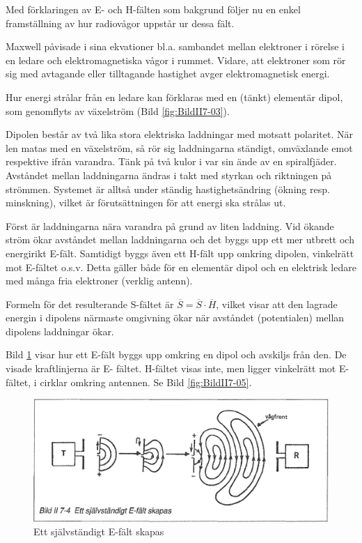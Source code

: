 Med förklaringen av E- och H-fälten som bakgrund följer nu en enkel
framställning av hur radiovågor uppstår ur dessa fält.

Maxwell påvisade i sina ekvationer bl.a.  sambandet mellan elektroner
i rörelse i en ledare och elektromagnetiska vågor i rummet.  Vidare,
att elektroner som rör sig med avtagande eller tilltagande hastighet
avger elektromagnetisk energi.

Hur energi strålar från en ledare kan förklaras med en (tänkt)
elementär dipol, som genomflyts av växelström (Bild \ref{fig:BildII7-03}).

Dipolen består av två lika stora elektriska laddningar med motsatt
polaritet. När len matas med en växelström, så rör sig laddningarna
ständigt, omväxlande emot respektive ifrån varandra. Tänk på två kulor
i var sin ände av en spiralfjäder. Avståndet mellan laddningarna
ändras i takt med styrkan och riktningen på strömmen. Systemet är
alltså under ständig hastighetsändring (ökning resp. minskning),
vilket är förutsättningen för att energi ska strålas ut.

Först är laddningarna nära varandra på grund av liten laddning. Vid
ökande ström ökar avståndet mellan laddningarna och det byggs upp ett
mer utbrett och energirikt E-fält. Samtidigt byggs även ett H-fält upp
omkring dipolen, vinkelrätt mot E-fältet o.s.v.  Detta gäller både för
en elementär dipol och en elektrisk ledare med många fria elektroner
(verklig antenn).

Formeln för det resulterande S-fältet är \(\overline{S} =
\overline{S}\cdot\overline{H}\), vilket visar att den lagrade energin
i dipolens närmaste omgivning ökar när avståndet (potentialen) mellan
dipolens laddningar ökar.

Bild \ref{fig:BildII7-04} visar hur ett E-fält byggs upp omkring en dipol och
avskiljs från den. De visade kraftlinjerna är E- fältet. H-fältet
visas inte, men ligger vinkelrätt mot E-fältet, i cirklar omkring
antennen. Se Bild \ref{fig:BildII7-05}.

\begin{figure}
\includegraphics[width=\textwidth]{images/bild_2_7-04}
\caption{Ett självständigt E-fält skapas}
\label{fig:BildII7-04}
\end{figure}

